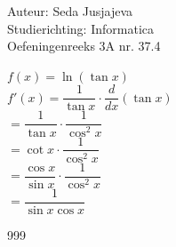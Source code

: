 \documentclass[a4paper]{article}
\begin{document}
\noindent \large Auteur: Seda Jusjajeva\\
\noindent \large Studierichting: Informatica\\
\noindent \large Oefeningenreeks 3A nr. 37.4 \\

\medskip

\normalsize


$f(x) = \ln(\tan x)$ \\

$f'(x) = \dfrac{1}{\tan x}\cdot\dfrac{d}{dx}(\tan x)$ \\

$= \dfrac{1}{\tan x}\cdot\dfrac{1}{\cos^2 x}$ \\

$= \cot x\cdot\dfrac{1}{\cos^2 x}$ \\

$= \dfrac{\cos x}{\sin x}\cdot\dfrac{1}{\cos^2 x}$ \\

$= \dfrac{1}{\sin x\cos x}$ \\




\begin{thebibliography}{999}
\end{thebibliography}
\end{document}
